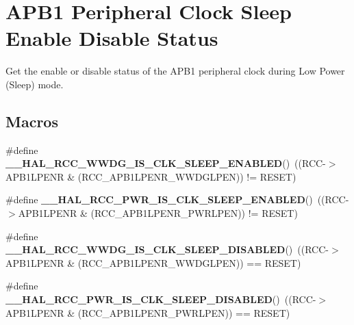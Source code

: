 \hypertarget{group___r_c_c___a_p_b1___clock___sleep___enable___disable___status}{}\section{A\+P\+B1 Peripheral Clock Sleep Enable Disable Status}
\label{group___r_c_c___a_p_b1___clock___sleep___enable___disable___status}


Get the enable or disable status of the A\+P\+B1 peripheral clock during Low Power (Sleep) mode.  


\subsection*{Macros}
\begin{DoxyCompactItemize}
\item 
\mbox{\label{group___r_c_c___a_p_b1___clock___sleep___enable___disable___status_ga60b229aff9ca29a44a5470f52a48bb2f}} 
\#define {\bfseries \+\_\+\+\_\+\+H\+A\+L\+\_\+\+R\+C\+C\+\_\+\+W\+W\+D\+G\+\_\+\+I\+S\+\_\+\+C\+L\+K\+\_\+\+S\+L\+E\+E\+P\+\_\+\+E\+N\+A\+B\+L\+ED}()~((R\+CC-\/$>$A\+P\+B1\+L\+P\+E\+NR \& (R\+C\+C\+\_\+\+A\+P\+B1\+L\+P\+E\+N\+R\+\_\+\+W\+W\+D\+G\+L\+P\+EN)) != R\+E\+S\+ET)
\item 
\mbox{\label{group___r_c_c___a_p_b1___clock___sleep___enable___disable___status_ga898edde3fc183744da208db023828303}} 
\#define {\bfseries \+\_\+\+\_\+\+H\+A\+L\+\_\+\+R\+C\+C\+\_\+\+P\+W\+R\+\_\+\+I\+S\+\_\+\+C\+L\+K\+\_\+\+S\+L\+E\+E\+P\+\_\+\+E\+N\+A\+B\+L\+ED}()~((R\+CC-\/$>$A\+P\+B1\+L\+P\+E\+NR \& (R\+C\+C\+\_\+\+A\+P\+B1\+L\+P\+E\+N\+R\+\_\+\+P\+W\+R\+L\+P\+EN)) != R\+E\+S\+ET)
\item 
\mbox{\label{group___r_c_c___a_p_b1___clock___sleep___enable___disable___status_ga3cbf3b3683a84bac98b6d15d921f5ec8}} 
\#define {\bfseries \+\_\+\+\_\+\+H\+A\+L\+\_\+\+R\+C\+C\+\_\+\+W\+W\+D\+G\+\_\+\+I\+S\+\_\+\+C\+L\+K\+\_\+\+S\+L\+E\+E\+P\+\_\+\+D\+I\+S\+A\+B\+L\+ED}()~((R\+CC-\/$>$A\+P\+B1\+L\+P\+E\+NR \& (R\+C\+C\+\_\+\+A\+P\+B1\+L\+P\+E\+N\+R\+\_\+\+W\+W\+D\+G\+L\+P\+EN)) == R\+E\+S\+ET)
\item 
\mbox{\label{group___r_c_c___a_p_b1___clock___sleep___enable___disable___status_ga13a44a1aacea32084e5bcdba69e4a636}} 
\#define {\bfseries \+\_\+\+\_\+\+H\+A\+L\+\_\+\+R\+C\+C\+\_\+\+P\+W\+R\+\_\+\+I\+S\+\_\+\+C\+L\+K\+\_\+\+S\+L\+E\+E\+P\+\_\+\+D\+I\+S\+A\+B\+L\+ED}()~((R\+CC-\/$>$A\+P\+B1\+L\+P\+E\+NR \& (R\+C\+C\+\_\+\+A\+P\+B1\+L\+P\+E\+N\+R\+\_\+\+P\+W\+R\+L\+P\+EN)) == R\+E\+S\+ET)
\end{DoxyCompactItemize}


